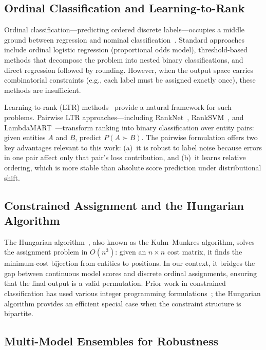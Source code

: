 \documentclass[conference]{IEEEtran}
\begin{document}
\subsection{Ordinal Classification and Learning-to-Rank}

Ordinal classification---predicting ordered discrete labels---occupies a middle ground between regression and nominal classification~\cite{cardoso2010classification}. Standard approaches include ordinal logistic regression (proportional odds model), threshold-based methods that decompose the problem into nested binary classifications, and direct regression followed by rounding. However, when the output space carries combinatorial constraints (e.g., each label must be assigned exactly once), these methods are insufficient.

Learning-to-rank (LTR) methods~\cite{liu2009learning} provide a natural framework for such problems. Pairwise LTR approaches---including RankNet~\cite{burges2005learning}, RankSVM~\cite{joachims2002optimizing}, and LambdaMART~\cite{burges2010ranknet}---transform ranking into binary classification over entity pairs: given entities $A$ and $B$, predict $P(A \succ B)$. The pairwise formulation offers two key advantages relevant to this work: (a)~it is robust to label noise because errors in one pair affect only that pair's loss contribution, and (b)~it learns relative ordering, which is more stable than absolute score prediction under distributional shift.

\subsection{Constrained Assignment and the Hungarian Algorithm}

The Hungarian algorithm~\cite{kuhn1955hungarian}, also known as the Kuhn--Munkres algorithm, solves the assignment problem in $O(n^3)$: given an $n \times n$ cost matrix, it finds the minimum-cost bijection from entities to positions. In our context, it bridges the gap between continuous model scores and discrete ordinal assignments, ensuring that the final output is a valid permutation. Prior work in constrained classification has used various integer programming formulations~\cite{cohen1999learning}; the Hungarian algorithm provides an efficient special case when the constraint structure is bipartite.

\subsection{Multi-Model Ensembles for Robustness}
\end{document}
